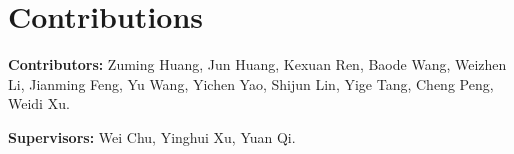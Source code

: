 \section{Contributions}

\textbf{Contributors:} Zuming Huang, Jun Huang, Kexuan Ren, Baode Wang, Weizhen Li, Jianming Feng, Yu Wang, Yichen Yao, Shijun Lin, Yige Tang, Cheng Peng, Weidi Xu.

\textbf{Supervisors:} Wei Chu, Yinghui Xu, Yuan Qi.
